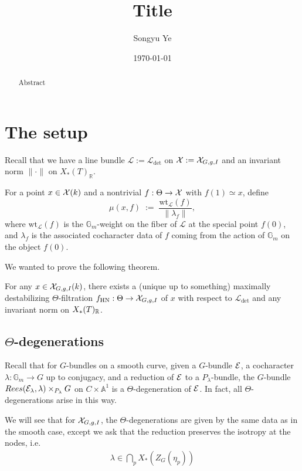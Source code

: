 \documentclass[12pt]{article}
\newcommand{\Rees}{Rees}
\begin{document}
\rhead{\today}
\cfoot{\thepage}

\title{Title}
\author{Songyu Ye}
\date{\today}
\maketitle

\begin{abstract}
    Abstract
\end{abstract}

\tableofcontents

\section{The setup}
Recall that we have a line bundle $\mathcal L:=\mathcal L_{\det}$ on ${\mathcal{X}}:={\mathcal{X}}_{G,g,I}$ and an invariant norm $\|\cdot\|$ on $X_*(T)_\mathbb R$.

For a point $x\in {\mathcal{X}}(k)$ and a nontrivial $f:\Theta\to {\mathcal{X}}$ with $f(1)\simeq x$, define
$$\mu(x,f)\;:=\;\frac{\mathrm{wt}_{\mathcal L}(f)}{\|\lambda_f\|},$$
where $\mathrm{wt}_{\mathcal L}(f)$ is the $\mathbb G_m$-weight on the fiber of $\mathcal L$ at the special point $f(0)$, and $\lambda_f$ is the associated cocharacter data of $f$ coming from the action of $\mathbb G_m$ on the object $f(0)$.

We wanted to prove the following theorem.
\begin{theorem}
    For any $x\in {\mathcal{X}}_{G,g,I}(k)$, there exists a (unique up to something) maximally destabilizing $\Theta$-filtration $f_{\mathrm{HN}}:\Theta\to {\mathcal{X}}_{G,g,I}$ of $x$ with respect to $\mathcal L_{\det}$ and any invariant norm on $X_*(T)_{\mathbb{R}}$.
\end{theorem}

\subsection{$\Theta$-degenerations}
Recall that for $G$-bundles on a smooth curve, given a $G$-bundle ${\mathcal{E}}$, a cocharacter $\lambda:\mathbb G_m\to G$ up to conjugacy, and a reduction of ${\mathcal{E}}$ to a $P_\lambda$-bundle, the $G$-bundle $\Rees(\cE_\lambda,\lambda)\times_{P_\lambda} G$ on $C\times \mathbb A^1$ is a $\Theta$-degeneration of ${\mathcal{E}}$. In fact, all $\Theta$-degenerations arise in this way.

We will see that for ${\mathcal{X}}_{G,g,I}$, the $\Theta$-degenerations are given by the same data as in the smooth case, except we ask that the reduction preserves the isotropy at the nodes, i.e. \begin{align*}
    \lambda \in \bigcap_p X_*(Z_G(\eta_p))
\end{align*}
\end{document}
